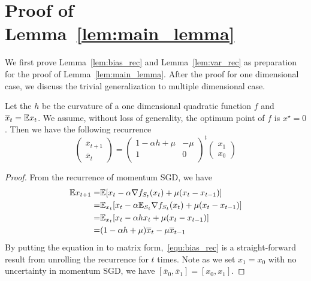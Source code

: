 \section{Proof of Lemma~\ref{lem:main_lemma}}
We first prove Lemma~\ref{lem:bias_rec} and Lemma~\ref{lem:var_rec} as preparation for the proof of Lemma~\ref{lem:main_lemma}. After the proof for one dimensional case, we discuss the trivial generalization to multiple dimensional case.
\begin{lemma}
\label{lem:bias_rec}
	Let the $h$ be the curvature of a one dimensional quadratic function $f$ and $\overline{x}_t = \mathbb{E} x_t$. We assume, without loss of generality, the optimum point of $f$ is $x^{\star}=0$. Then we have the following recurrence
	\begin{equation} 
		\begin{pmatrix}
			\overline{x}_{t + 1} \\
			\overline{x}_t
		\end{pmatrix} = 
		\begin{pmatrix}
			1-\alpha h + \mu & - \mu\\
			1 & 0 \\
		\end{pmatrix}^{t}
		\begin{pmatrix}
			x_1 \\
			x_0
		\end{pmatrix}
		\label{equ:bias_rec}
	\end{equation} 
	\begin{proof}
		From the recurrence of momentum SGD, %
		we have
		\begin{equation*}
			\begin{aligned}
				\mathbb{E} x_{t + 1} = & \mathbb{E} [ x_{t} - \alpha \nabla f_{S_t} (x_t) + \mu (x_t - x_{t - 1} ) ]\\
							= & \mathbb{E}_{x_{t}}	[ x_{t} - \alpha \mathbb{E}_{S_t} \nabla f_{S_t} (x_t) + \mu (x_t - x_{t - 1} ) ] \\
							= & \mathbb{E}_{x_{t}}	[ x_{t} - \alpha h x_t + \mu (x_t - x_{t - 1} ) ] \\
							= & (1 - \alpha h + \mu)\overline{x}_t - \mu\overline{x}_{t - 1}
			\end{aligned}
		\end{equation*}
		By putting the equation in to matrix form,~\eqref{equ:bias_rec} is a straight-forward result from unrolling the recurrence for $t$ times. Note as we set $x_1 = x_0$ with no uncertainty in momentum SGD, we have $[\overline{x}_0, \overline{x}_1] = [x_0, x_1]$.
	\end{proof}
\end{lemma}

